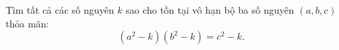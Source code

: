 \ifshowproblem
\begin{problem}\label{example:RUS-2015-TST-D10-P3}
    Tìm tất cả các số nguyên \( k \) sao cho tồn tại vô hạn bộ ba số nguyên \( (a, b, c) \) thỏa mãn:
    \[
        (a^2 - k)(b^2 - k) = c^2 - k.
    \]    
\end{problem}
\fi

\footnotemark
{}
\fi